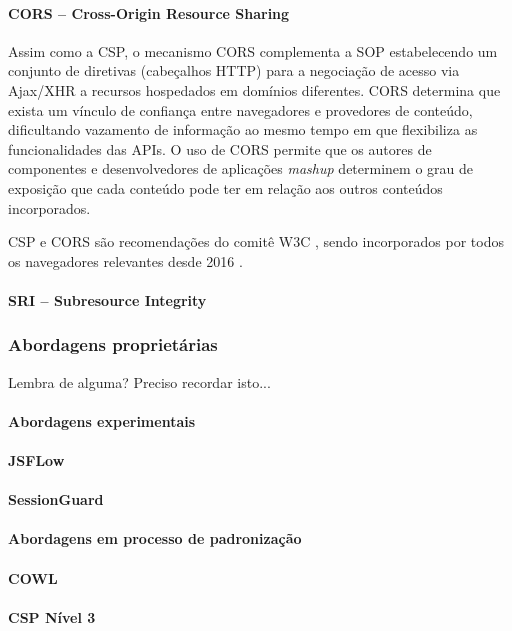\paragraph{CORS -- Cross-Origin Resource Sharing}
Assim como a CSP, o mecanismo CORS \cite{W3C:CORS} complementa a SOP estabelecendo um conjunto de diretivas (cabeçalhos HTTP) para a negociação de acesso via Ajax/XHR a recursos hospedados em domínios diferentes. CORS determina que exista um vínculo de confiança entre navegadores e provedores de conteúdo, dificultando vazamento de informação ao mesmo tempo em que flexibiliza as funcionalidades das APIs. O uso de CORS permite que os autores de componentes e desenvolvedores de aplicações \textit{mashup} determinem o grau de exposição que cada conteúdo pode ter em relação aos outros conteúdos incorporados.

CSP e CORS são recomendações do comitê W3C \cite{W3C:CSP} \cite{W3C:CORS}, sendo incorporados por todos os navegadores relevantes desde 2016 \cite{CanIUse:CSP} \cite{CanIUse:CORS}.

\paragraph{SRI -- Subresource Integrity}



\subsubsection{Abordagens proprietárias}
\begin{todo}
Lembra de alguma? Preciso recordar isto...
\end{todo}


\paragraph{Abordagens experimentais}
\paragraph{JSFLow}
\paragraph{SessionGuard}


\paragraph{Abordagens em processo de padronização}
\paragraph{COWL}
\paragraph{CSP Nível 3}
